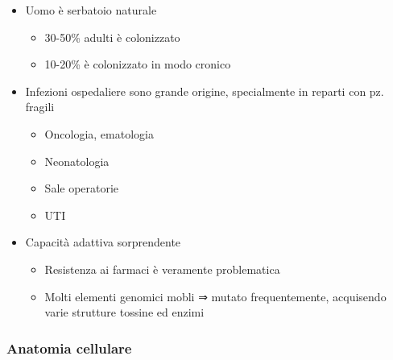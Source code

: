 \documentclass[italian,]{article}
\providecommand{\tightlist}{%
  \setlength{\itemsep}{0pt}\setlength{\parskip}{0pt}}
\begin{document}
\begin{itemize}
\tightlist
\item
  Uomo è serbatoio naturale

  \begin{itemize}
  \tightlist
  \item
    30-50\% adulti è colonizzato
  \item
    10-20\% è colonizzato in modo cronico
  \end{itemize}
\item
  Infezioni ospedaliere sono grande origine, specialmente in reparti con
  pz. fragili

  \begin{itemize}
  \tightlist
  \item
    Oncologia, ematologia
  \item
    Neonatologia
  \item
    Sale operatorie
  \item
    UTI
  \end{itemize}
\item
  Capacità adattiva sorprendente

  \begin{itemize}
  \tightlist
  \item
    Resistenza ai farmaci è veramente problematica
  \item
    Molti elementi genomici mobli ⇒ mutato frequentemente, acquisendo
    varie strutture tossine ed enzimi
  \end{itemize}
\end{itemize}

\hypertarget{anatomia-cellulare}{%
\subsubsection{Anatomia cellulare}\label{anatomia-cellulare}}
\end{document}
